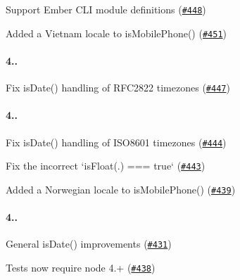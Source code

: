 \begin{DoxyItemize}
\item Support Ember C\+LI module definitions (\href{https://github.com/chriso/validator.js/pull/448}{\tt \#448})
\item Added a Vietnam locale to {\ttfamily is\+Mobile\+Phone()} (\href{https://github.com/chriso/validator.js/pull/451}{\tt \#451})
\end{DoxyItemize}

\paragraph*{4..}


\begin{DoxyItemize}
\item Fix {\ttfamily is\+Date()} handling of R\+F\+C2822 timezones (\href{https://github.com/chriso/validator.js/pull/447}{\tt \#447})
\end{DoxyItemize}

\paragraph*{4..}


\begin{DoxyItemize}
\item Fix {\ttfamily is\+Date()} handling of I\+S\+O8601 timezones (\href{https://github.com/chriso/validator.js/pull/444}{\tt \#444})
\item Fix the incorrect `is\+Float(\textquotesingle{}.\textquotesingle{}) === true` (\href{https://github.com/chriso/validator.js/pull/443}{\tt \#443})
\item Added a Norwegian locale to {\ttfamily is\+Mobile\+Phone()} (\href{https://github.com/chriso/validator.js/pull/439}{\tt \#439})
\end{DoxyItemize}

\paragraph*{4..}


\begin{DoxyItemize}
\item General {\ttfamily is\+Date()} improvements (\href{https://github.com/chriso/validator.js/pull/431}{\tt \#431})
\item Tests now require node 4.+ (\href{https://github.com/chriso/validator.js/pull/438}{\tt \#438})
\end{DoxyItemize}

